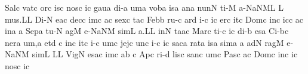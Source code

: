 \spatium
\sgn Sal\punctum c\egn
\sgn vat\punctum c\egn
\sgn {}or\punctum c\egn
\sgn {}is\punctum c\egn
\spatium
\sgn nos\punctum c\egn
{}i{}\punctum c\egn
\spatium
\sgn gau\punctum a\egn
\sgn di-\punctum a\egn
\sgn {}um\punctum a\egn
\spatium
\sgn vob\punctum a\egn
\sgn {}is\punctum a\egn
\spatium
\sgn {}an\punctum a\egn
\sgn nun\punctum N\egn
\sgn ti-\punctum M\egn
\sgn {}a-\pessubbipunctis NaNM\nonspatium\punctuminclinatum L\egn
\custos L
\lineaproxima
\sgn mu{s.}\punctum L\augmentum L\egn
\spatium
\divisiofinalis
\spatium
\sgn Di-\punctum N\egn
\sgn {}e{}\pes ac\egn
\spatium
\sgn dec\punctum c\egn
\sgn {}im\punctum c\egn
\sgn {}a{}\punctum c\egn
\spatium
\sgn sex\punctum c\egn
\sgn ta{}\punctum c\egn
\spatium
\sgn Feb\punctum b\egn
\sgn ru-\punctum c\egn
\sgn {}ar\punctum d\egn
\sgn {}i-\punctum c\egn
\sgn {}i{}\punctum c\egn
\spatium
\sgn {}er\punctum c\egn
\sgn {}it\punctum c\egn
\spatium
\sgn Dom\punctum c\egn
\sgn {}in\punctum c\egn
\sgn {}ic\punctum c\egn
\sgn {}a{}\punctum c\egn
\spatium
\sgn {}in\punctum a\egn
\spatium
\custos a
\lineaproxima
\sgn Sep\punctum a\egn
\sgn tu-\punctum N\egn
\sgn {}ag\punctum M\egn
\sgn {}e-\pessubbipunctis NaNM\egn
\sgn sim\punctum L\egn
\sgn {}a.\punctum L\augmentum L\egn
\spatium
\divisiofinalis
\spatium
{}in\punctum N\egn
\sgn ta{}\pes ac\egn
\spatium
\sgn Mar\punctum c\egn
\sgn ti-\punctum c\egn
\sgn {}i{}\punctum c\egn
\spatium
\sgn di-\punctum b\egn
\sgn {}es\punctum a\egn
\spatium
\sgn Ci-\pes bc\egn
\sgn ner\punctum a\egn
\sgn {}u{m,}\punctum a\egn
\spatium
\divisiominima
\spatium
\sgn {}et\punctum d\egn
\spatium
\custos c
\lineaproxima
\sgn {}in\punctum c\egn
\sgn {}it\punctum c\egn
\sgn {}i-\punctum c\egn
\sgn {}um\punctum c\egn
\spatium
\sgn jej\punctum c\egn
\sgn {}un\punctum c\egn
\sgn {}i-\punctum c\egn
\sgn {}i{}\punctum c\egn
\spatium
\sgn sac\punctum a\egn
\sgn rat\punctum a\egn
\sgn {}is\punctum a\egn
\sgn sim\punctum a\egn
\sgn {}{\ae}{}\punctum a\egn
\spatium
{}ad\punctum N\egn
\sgn rag\punctum M\egn
\sgn {}e-\pessubbipunctis NaNM\egn
\sgn sim\punctum L\egn
\sgn {}{\ae}{}\punctum L\augmentum L\egn
\spatium
\divisiofinalis
\spatium
\sgn Vig\punctum N\egn
\sgn {}es\pes ac\egn
\sgn {}im\punctum c\egn
\sgn {}a{}\punctum b\egn
\spatium
\custos c
\lineaproxima
\sgn {}Ap\punctum c\egn
\sgn ri-\punctum d\egn
\sgn lis\punctum c\egn
\spatium
\sgn san\punctum c\egn
{}um\punctum c\egn
\spatium
\sgn Pas\punctum c\egn
{}a{}\punctum c\egn
\spatium
\sgn Dom\punctum c\egn
\sgn {}in\punctum c\egn
\sgn {}i{}\punctum c\egn
\spatium
\sgn nos\punctum c\egn
{}i{}\punctum c\egn
